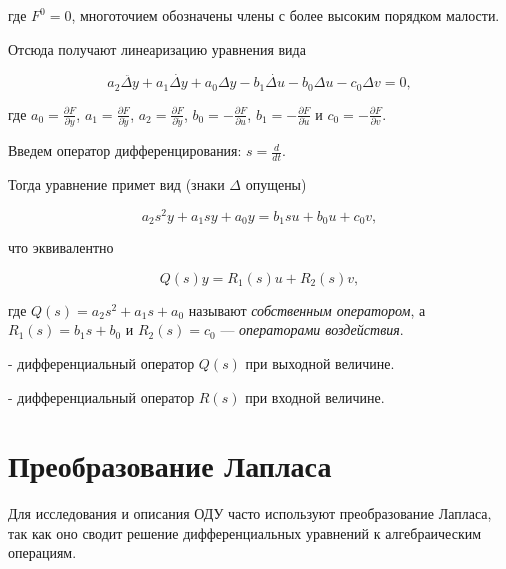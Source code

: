 \documentclass[../../TAU.tex]{subfiles}
\begin{document}
    где $F^0= 0$, многоточием обозначены члены с более высоким порядком малости.

    Отсюда получают линеаризацию уравнения 
    вида

    \begin{equation}\label{EQ_LINEAR}
        a_2\ddot{\Delta y} + a_1 \dot{\Delta y} + a_0 \Delta y - b_1\dot{\Delta u} - b_0\Delta u - c_0 \Delta v = 0,
    \end{equation}

    где 
    $a_0 = \frac{\partial F}{\partial y}$, 
    $a_1 = \frac{\partial F}{\partial \dot y}$, $a_2 = \frac{\partial F}{\partial \ddot y}$, 
    $b_0 = -\frac{\partial F}{\partial u}$, 
    $b_1 = -\frac{\partial F}{\partial \dot u }$ и 
    $c_0 = -\frac{\partial F}{\partial v}$.

    Введем оператор дифференцирования: 
    $s = \frac{d}{dt}$.

    Тогда уравнение 
     примет вид (знаки $\Delta$ опущены)
    
    \begin{equation}
        a_2 s^2 y + a_1 s y + a_0 y = b_1 s u + b_0 u + c_0 v,
    \end{equation}
    
    что эквивалентно
    
    \begin{equation}
        Q(s) y = R_1(s)u + R_2(s)v,
    \end{equation}
    
    где 
    $Q(s) = a_2s^2 + a_1 s + a_0$ 
    называют {\it собственным оператором}, а 
    $R_1(s) = b_1s+b_0$ и 
    $R_2(s) = c_0$
     --- {\it операторами воздействия}.

     - дифференциальный оператор $Q(s)$ при выходной величине.

     - дифференциальный оператор $R(s)$ при входной величине.




\section{Преобразование Лапласа} %

    Для исследования и описания ОДУ часто используют преобразование Лапласа, так как оно сводит решение дифференциальных уравнений к алгебраическим операциям.
\end{document}
